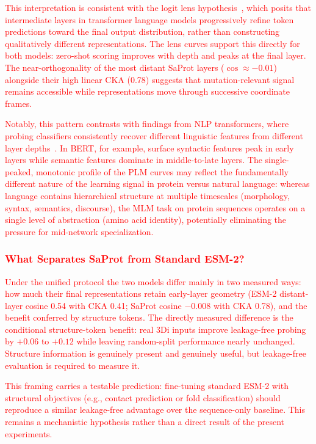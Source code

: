\documentclass[11pt,a4paper]{article}
\newcommand{\rev}[1]{\textcolor{red}{#1}}
\begin{document}
\textcolor{red}{This interpretation is consistent with the logit lens
hypothesis~\cite{nostalgebraist2020,belrose2023eliciting},
which posits that intermediate layers in transformer language models progressively
refine token predictions toward the final output distribution, rather than
constructing qualitatively different representations. \rev{The lens curves
support this directly for both models: zero-shot scoring improves with depth
and peaks at the final layer.} The near-orthogonality of the most distant SaProt
layers ($\cos \approx -0.01$) \rev{alongside their high linear CKA (0.78)}
suggests that mutation-relevant signal
remains accessible while
representations move through successive coordinate frames.}

\textcolor{red}{Notably, this pattern contrasts with findings from NLP transformers, where
probing classifiers consistently recover different linguistic features from
different layer depths~\cite{tenney2019bert,rogers2021bertology}. In BERT, for example,
surface syntactic features peak in early layers while semantic features dominate in
middle-to-late layers. \rev{The single-peaked, monotonic profile of the PLM
curves may
reflect the fundamentally different nature of the learning signal in protein
versus natural language: whereas language contains hierarchical structure at
multiple timescales (morphology, syntax, semantics, discourse), the MLM task on
protein sequences operates on a single level of abstraction (amino acid identity),
potentially eliminating the pressure for mid-network specialization.}}

\textcolor{red}{\subsubsection{\rev{What Separates SaProt from Standard ESM-2?}}}

\textcolor{red}{\rev{Under the unified protocol the two models differ mainly in two measured
ways: how much their final representations retain early-layer geometry (ESM-2
distant-layer cosine 0.54 with CKA 0.41; SaProt cosine $-0.008$ with CKA
0.78), and the benefit conferred by structure tokens. The directly measured
difference is the conditional structure-token benefit: real 3Di inputs improve
leakage-free probing by $+0.06$ to $+0.12$ while leaving random-split performance
nearly unchanged. Structure information is genuinely present and genuinely
useful, but leakage-free evaluation is required to measure it.}}

\textcolor{red}{\rev{This framing carries a testable prediction: fine-tuning standard ESM-2
with structural objectives (e.g., contact prediction or fold classification)
should reproduce a similar leakage-free advantage over the sequence-only baseline.
This remains a mechanistic hypothesis rather than a direct result of the present
experiments.}}
\end{document}
